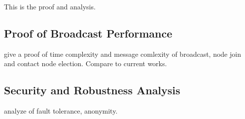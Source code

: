 This is the proof and analysis. \\

\subsection{Proof of Broadcast Performance}

give a proof of time complexity and message comlexity of broadcast, node join and contact node election. Compare to current works.

\subsection{Security and Robustness Analysis}

analyze of fault tolerance, anonymity.